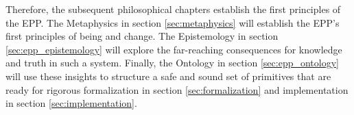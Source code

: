 Therefore, the subsequent philosophical chapters establish the first principles of the EPP. The Metaphysics in section \ref{sec:metaphysics} will establish the EPP's first principles of being and change. The Epistemology in section \ref{sec:epp_epistemology} will explore the far-reaching consequences for knowledge and truth in such a system. Finally, the Ontology in section \ref{sec:epp_ontology} will use these insights to structure a safe and sound set of primitives that are ready for rigorous formalization in section \ref{sec:formalization} and implementation in section \ref{sec:implementation}. 

\newpage